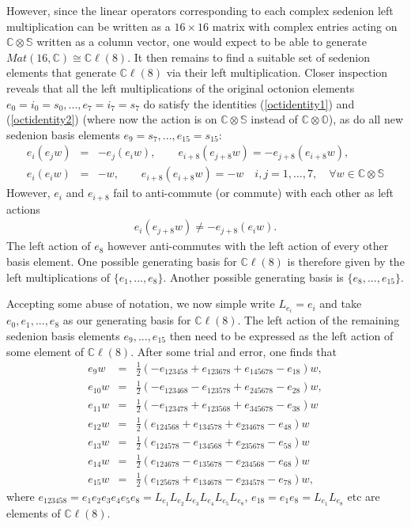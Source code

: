 \documentclass{article}
\newcommand{\bb}[1]{\mathbb{#1}}
\begin{document}
However, since the linear operators corresponding to each complex sedenion left multiplication can be written as a $16\times 16$ matrix with complex entries acting on $\bb{C}\otimes\bb{S}$ written as a column vector, one would expect to be able to generate $Mat(16,\bb{C})\cong \bb{C}\ell(8)$. It then remains to find a suitable set of sedenion elements that generate $\bb{C}\ell(8)$ via their left multiplication. Closer inspection reveals that all the left multiplications of the original octonion elements $e_0=i_0=s_0,...,e_7=i_7=s_7$ do satisfy the identities (\ref{octidentity1}) and (\ref{octidentity2}) (where now the action is on $\bb{C}\otimes\bb{S}$ instead of $\bb{C}\otimes\bb{O}$), 
as do all new sedenion basis elements $e_9=s_7,...,e_{15}=s_{15}$:
\begin{eqnarray}
    e_i(e_jw)&=&-e_j(e_iw),\qquad e_{i+8}(e_{j+8}w)= -e_{j+8}(e_{i+8}w),\\
    e_i(e_iw)&=&-w,\qquad e_{i+8}(e_{i+8}w)= -w\quad i,j=1,...,7,\quad \forall w\in\bb{C}\otimes\bb{S}
\end{eqnarray}
However, $e_i$ and $e_{i+8}$ fail to anti-commute (or commute) with each other as left actions
\begin{eqnarray}
   e_i(e_{j+8}w)\neq -e_{j+8}(e_iw). 
\end{eqnarray}
The left action of $e_8$ however anti-commutes with the left action of every other basis element. One possible generating basis for $\bb{C}\ell(8)$ is therefore given by the left multiplications of $\{e_1,...,e_8\}$. Another possible generating basis is $\{e_8,...,e_{15}\}$.

Accepting some abuse of notation, we now simple write $L_{e_i}=e_i$ and take ${e_0,e_1,...,e_8}$ as our generating basis for $\bb{C}\ell(8)$. The left action of the remaining sedenion basis elements $e_9,...,e_{15}$ then need to be expressed as the left action of some element of $\bb{C}\ell(8)$. After some trial and error, one finds that
\begin{eqnarray}
    e_9w&=&\frac{1}{2}(-e_{123458}+e_{123678}+e_{145678}-e_{18})w,\\
    e_{10}w&=&\frac{1}{2}(-e_{123468}-e_{123578}+e_{245678}-e_{28})w,\\
    e_{11}w&=&\frac{1}{2}(-e_{123478}+e_{123568}+e_{345678}-e_{38})w\\
    e_{12}w&=&\frac{1}{2}(e_{124568}+e_{134578}+e_{234678}-e_{48})w\\
    e_{13}w&=&\frac{1}{2}(e_{124578}-e_{134568}+e_{235678}-e_{58})w\\
    e_{14}w&=&\frac{1}{2}(e_{124678}-e_{135678}-e_{234568}-e_{68})w\\
    e_{15}w&=&\frac{1}{2}(e_{125678}+e_{134678}-e_{234578}-e_{78})w,
\end{eqnarray}
where $e_{123458}=e_1e_2e_3e_4e_5e_8=L_{e_1}L_{e_2}L_{e_3}L_{e_4}L_{e_5}L_{e_8}$, $e_{18}=e_1e_8=L_{e_1}L_{e_8}$ etc are elements of $\bb{C}\ell(8)$. 
\end{document}
